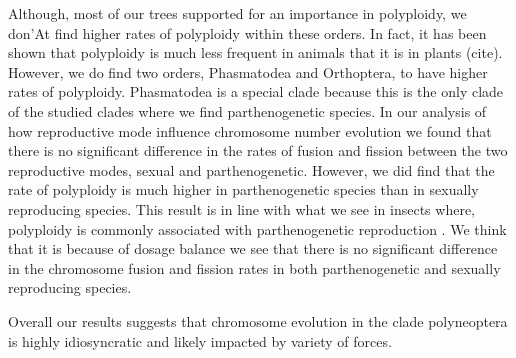Although, most of our trees supported for an importance in polyploidy, we don'At find higher rates of polyploidy within these orders.
In fact, it has been shown that polyploidy is much less frequent in animals that it is in plants (cite).
However, we do find two orders, Phasmatodea and Orthoptera, to have higher rates of polyploidy.
Phasmatodea is a special clade because this is the only clade of the studied clades where we find parthenogenetic species. 
In our analysis of how reproductive mode influence chromosome number evolution we found that there is no significant difference in the rates of fusion and fission between the two reproductive modes, sexual and parthenogenetic. 
However, we did find that the rate of polyploidy is much higher in parthenogenetic species than in sexually reproducing species. 
This result is in line with what we see in insects where, polyploidy is commonly associated with parthenogenetic reproduction \citep{lokki1980polyploidy}.
We think that it is because of dosage balance we see that there is no significant difference in the chromosome fusion and fission rates in both parthenogenetic and sexually reproducing species. 

Overall our results suggests that chromosome evolution in the clade polyneoptera is highly idiosyncratic and likely impacted by variety of forces.